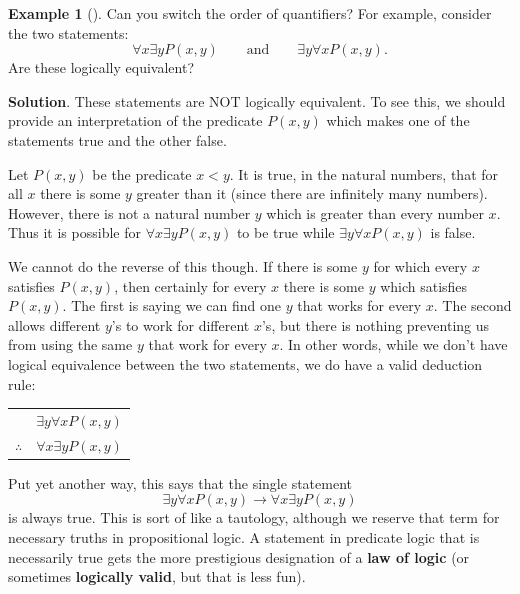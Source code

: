 \documentclass[10pt,]{book}
\newcommand{\terminology}[1]{\textbf{#1}}
\theoremstyle{plain}
\theoremstyle{definition}
\theoremstyle{definition}
\newtheorem{example}[theorem]{Example}
\theoremstyle{definition}
\theoremstyle{definition}
\numberwithin{equation}{chapter}
\newcommand{\hrulethin}  {\noalign{\hrule height 0.04em}}
\def\imp{\rightarrow}
\newcommand{\lt}{<}
\begin{document}
\begin{example}[]\label{example-63}
\hypertarget{p-1958}{}%
Can you switch the order of quantifiers? For example, consider the two statements:%
\begin{equation*}
\forall x \exists y P(x,y) \qquad \mathrm{ and } \qquad \exists y \forall x P(x,y).
\end{equation*}
Are these logically equivalent?%
\par\smallskip%
\noindent\textbf{Solution}.\hypertarget{solution-174}{}\quad%
\hypertarget{p-1959}{}%
These statements are NOT logically equivalent. To see this, we should provide an interpretation of the predicate \(P(x,y)\) which makes one of the statements true and the other false.%
\par
\hypertarget{p-1960}{}%
Let \(P(x,y)\) be the predicate \(x \lt  y\). It is true, in the natural numbers, that for all \(x\) there is some \(y\) greater than it (since there are infinitely many numbers). However, there is not a natural number \(y\) which is greater than every number \(x\).  Thus it is possible for \(\forall x \exists y P(x,y)\) to be true while \(\exists y \forall x P(x,y)\) is false.%
\par
\hypertarget{p-1961}{}%
We cannot do the reverse of this though. If there is some \(y\) for which every \(x\) satisfies \(P(x,y)\), then certainly for every \(x\) there is some \(y\) which satisfies \(P(x,y)\). The first is saying we can find one \(y\) that works for every \(x\). The second allows different \(y\)'s to work for different \(x\)'s, but there is nothing preventing us from using the same \(y\) that work for every \(x\).  In other words, while we don't have logical equivalence between the two statements, we do have a valid deduction rule:%
\begin{sidebyside}{1}{0}{0}{0}
\begin{sbspanel}{1}
{\centering%
\begin{tabular}{cc}
&\(\exists y \forall x P(x,y)\)\tabularnewline\hrulethin
\(\therefore\)&\(\forall x \exists y P(x,y)\)
\end{tabular}
\par}
\end{sbspanel}
\end{sidebyside}
\par
\hypertarget{p-1962}{}%
Put yet another way, this says that the single statement%
\begin{equation*}
\exists y \forall x P(x,y) \imp \forall x \exists y P(x,y)
\end{equation*}
is always true.  This is sort of like a tautology, although we reserve that term for necessary truths in propositional logic.  A statement in predicate logic that is necessarily true gets the more prestigious designation of a \terminology{law of logic} (or sometimes \terminology{logically valid}, but that is less fun).%
\end{example}
\typeout{************************************************}
\typeout{************************************************}
\end{document}
